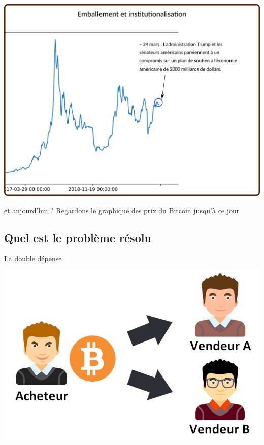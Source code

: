 \documentclass[presentation]{beamer}
\begin{document}
\begin{frame}[label={sec:org5395d1f}]{}
\begin{center}
\includegraphics[width=.95\textwidth]{./Pictures/Timeline/90emballement_trump.png}
\end{center}
\end{frame}

\begin{frame}[label={sec:org2f8f553}]{et aujourd'hui ?}
\href{https://www.coingecko.com/en/coins/bitcoin/usd?chart=7\_days\#panel}{Regardons le graphique des prix du Bitcoin jusqu'à ce jour}
\end{frame}

\subsection{Quel est le problème résolu}
\label{sec:org45541bd}
\begin{frame}[label={sec:orgaffe3e9}]{La double dépense}
\begin{center}
\includegraphics[width=.8\textwidth]{Pictures/double_depense.png}
\end{center}
\end{frame}
\end{document}

